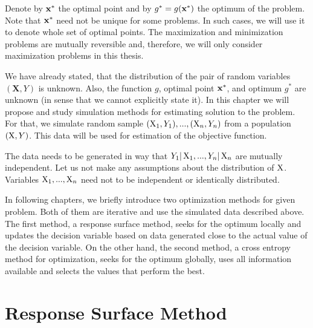 Denote by $\mathbf{x}^{*}$ the optimal point and by $g^{*} = g(\mathbf{x}^{*})$ the optimum of the problem. Note that $\mathbf{x}^{*}$ need not be unique for some problems. In such cases, we will use it to denote whole set of optimal points. The maximization and minimization problems are mutually reversible and, therefore, we will only consider maximization problems in this thesis.

We have already stated, that the distribution of the pair of random variables $(\mathbf{X}, Y)$ is unknown. Also, the function $g$, optimal point $\mathbf{x}^{*}$, and optimum $g^{*}$ are unknown (in sense that we cannot explicitly state it). In this chapter we will propose and study simulation methods for estimating solution to the problem. For that, we simulate random sample $(\operatorname{\bm{X}}_1, Y_1), ..., (\operatorname{\bm{X}}_n, Y_n)$ from a population $(\operatorname{\bm{X}}, Y)$. This data will be used for estimation of the objective function.

The data needs to be generated in way that $Y_1 \vert \operatorname{\bm{X}}_1, ..., Y_n \vert \operatorname{\bm{X}}_n$ are mutually independent. Let us not make any assumptions about the distribution of $\operatorname{\bm{X}}$. Variables $\operatorname{\bm{X}}_1, ..., \operatorname{\bm{X}}_n$ need not to be independent or identically distributed.

In following chapters, we briefly introduce two optimization methods for given problem. Both of them are iterative and use the simulated data described above. The first method, a response surface method, seeks for the optimum locally and updates the decision variable based on data generated close to the actual value of the decision variable. On the other hand, the second method, a cross entropy method for optimization, seeks for the optimum globally, uses all information available and selects the values that perform the best.





\section{Response Surface Method}
	\label{chap:responseSurface}
	

